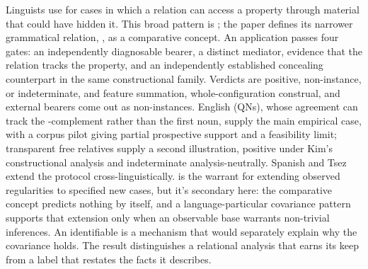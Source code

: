 Linguists use  for cases in which a relation can access a property through material that could have hidden it. This broad pattern is ; the paper defines its narrower grammatical relation, , as a comparative concept. An application passes four gates: an independently diagnosable bearer, a distinct mediator, evidence that the relation tracks the property, and an independently established concealing counterpart in the same constructional family. Verdicts are positive, non-instance, or indeterminate, and feature summation, whole-configuration construal, and external bearers come out as non-instances. English  (QNs), whose agreement can track the -complement rather than the first noun, supply the main empirical case, with a corpus pilot giving partial prospective support and a feasibility limit; transparent free relatives supply a second illustration, positive under Kim's constructional analysis and indeterminate analysis-neutrally. Spanish and Tsez extend the protocol cross-linguistically.  is the warrant for extending observed regularities to specified new cases, but it's secondary here: the comparative concept predicts nothing by itself, and a language-particular covariance pattern supports that extension only when an observable base warrants non-trivial inferences. An identifiable  is a mechanism that would separately explain why the covariance holds. The result distinguishes a relational analysis that earns its keep from a label that restates the facts it describes.
